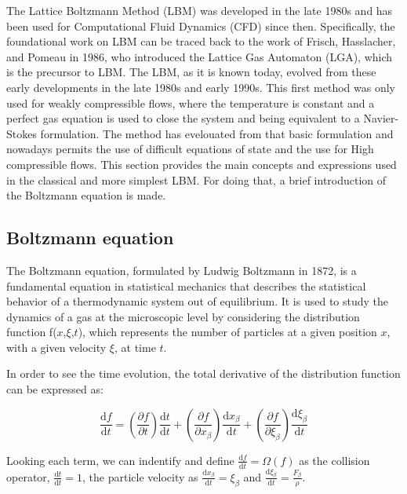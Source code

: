The Lattice Boltzmann Method (LBM) was developed in the late 1980s and has been used
for Computational Fluid Dynamics (CFD) since then. Specifically, the foundational
work on LBM can be traced back to the work of Frisch, Hasslacher, and Pomeau in 
1986, who introduced the Lattice Gas Automaton (LGA), which is the precursor to 
LBM. The LBM, as it is known today, evolved from these early developments in the 
late 1980s and early 1990s. This first method was only used for weakly compressible
flows, where the temperature is constant and a perfect gas equation is used to close
the system and being equivalent to a Navier-Stokes formulation. The method has 
evelouated from that basic formulation and nowadays permits the use of difficult 
equations of state and the use for High compressible flows. 
This section provides the main concepts and expressions used in the classical and 
more simplest LBM. For doing that, a brief introduction of the Boltzmann equation
is made. 

\subsection{Boltzmann equation}
The Boltzmann equation, formulated by Ludwig Boltzmann in 1872, is a fundamental
equation in statistical mechanics that describes the statistical behavior of a 
thermodynamic system out of equilibrium. It is used to study the dynamics of a 
gas at the microscopic level by considering the distribution function 
f($x$,$\xi$,$t$), which represents the number of particles at a given 
position $x$, with a given velocity $\xi$, at time $t$.

In order to see the time evolution, the total derivative of the distribution
function can be expressed as:

\begin{equation}
	\frac{\mathrm{d}f}{\mathrm{d}t} = 
	\left(\frac{\partial f}{\partial t}\right)\frac{\mathrm{d}t}{\mathrm{d}t}
	+\left(\frac{\partial f}{\partial x_{\beta}}\right)\frac{\mathrm{d}x_{\beta}}{\mathrm{d}t}
	+\left(\frac{\partial f}{\partial \xi_{\beta}}\right)\frac{\mathrm{d}\xi_{\beta}}{\mathrm{d}t}
\end{equation}

Looking each term, we can indentify and define $\frac{\mathrm{d}f}{\mathrm{d}t} = \Omega(f)$
as the collision operator, $\frac{\mathrm{d}t}{\mathrm{d}t}=1$, 
the particle velocity as $\frac{\mathrm{d}x_{\beta}}{\mathrm{d}t} = \xi_{\beta}$
and $\frac{\mathrm{d}\xi_{\beta}}{\mathrm{d}t} = \frac{F_{\beta}}{\rho}$.


